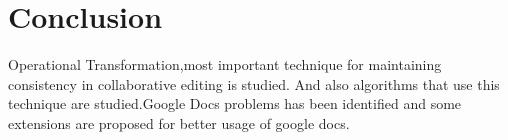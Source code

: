 \section{Conclusion}
Operational Transformation,most important technique for maintaining consistency in collaborative editing is studied.
And also algorithms that use this technique are studied.Google Docs problems has been identified and 
some extensions are proposed for better usage of google docs.
